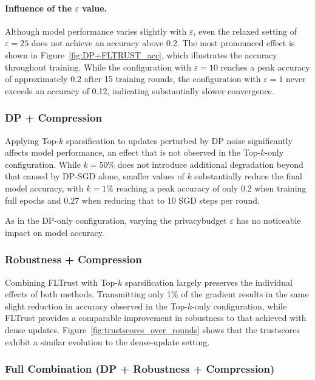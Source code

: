 \documentclass[11pt,twocolumn,a4paper,DIV=calc,parskip=half]{scrartcl}
\begin{document}
	\paragraph{Influence of the $\varepsilon$ value.}
	Although model performance varies slightly with $\varepsilon$, even the relaxed setting of $\varepsilon = 25$ does not achieve an accuracy above 0.2. The most pronounced effect is shown in Figure~\ref{fig:DP+FLTRUST_acc}, which illustrates the accuracy throughout training. While the configuration with $\varepsilon = 10$ reaches a peak accuracy of approximately 0.2 after 15 training rounds, the configuration with $\varepsilon = 1$ never exceeds an accuracy of 0.12, indicating substantially slower convergence.


	
	\subsubsection{\ac{DP} + Compression}
	
	Applying Top-$k$ sparsification to updates perturbed by \ac{DP} noise significantly affects model performance, an effect that is not observed in the Top-$k$-only configuration. While $k=50\%$ does not introduce additional degradation beyond that caused by \ac{DP-SGD} alone, smaller values of $k$ substantially reduce the final model accuracy, with $k=1\%$ reaching a peak accuracy of only 0.2 when training full epochs and 0.27 when reducing that to 10 SGD steps per round.
	
	As in the \ac{DP}-only configuration, varying the \gls{privacybudget} $\varepsilon$ has no noticeable impact on model accuracy.
	
	\subsubsection{Robustness + Compression}
	
	Combining FLTrust with Top-$k$ sparsification largely preserves the individual effects of both methods. Transmitting only 1\% of the gradient results in the same slight reduction in accuracy observed in the Top-$k$-only configuration, while FLTrust provides a comparable improvement in robustness to that achieved with dense updates. Figure~\ref{fig:trustscores_over_rounds} shows that the \glspl{trustscore} exhibit a similar evolution to the dense-update setting.
	
	\subsubsection{Full Combination (\ac{DP} + Robustness + Compression)}
	
\end{document}
